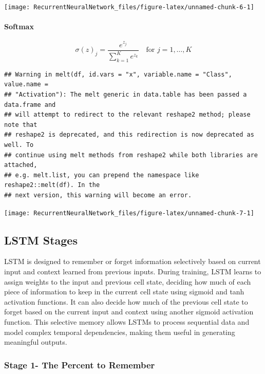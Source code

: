 \documentclass[
]{article}
\begin{document}
\begin{center}\texttt{[image: RecurrentNeuralNetwork\_files/figure-latex/unnamed-chunk-6-1]} \end{center}

\hypertarget{softmax}{%
\paragraph{Softmax}\label{softmax}}

\[ \sigma(z)_j = \frac{e^{z_j}}{\sum_{k=1}^K e^{z_k}} \quad \text{for } j = 1,\dots,K \]

\begin{verbatim}
## Warning in melt(df, id.vars = "x", variable.name = "Class", value.name =
## "Activation"): The melt generic in data.table has been passed a data.frame and
## will attempt to redirect to the relevant reshape2 method; please note that
## reshape2 is deprecated, and this redirection is now deprecated as well. To
## continue using melt methods from reshape2 while both libraries are attached,
## e.g. melt.list, you can prepend the namespace like reshape2::melt(df). In the
## next version, this warning will become an error.
\end{verbatim}

\begin{center}\texttt{[image: RecurrentNeuralNetwork\_files/figure-latex/unnamed-chunk-7-1]} \end{center}

\hypertarget{lstm-stages}{%
\subsection{LSTM Stages}\label{lstm-stages}}

LSTM is designed to remember or forget information selectively based on
current input and context learned from previous inputs. During training,
LSTM learns to assign weights to the input and previous cell state,
deciding how much of each piece of information to keep in the current
cell state using sigmoid and tanh activation functions. It can also
decide how much of the previous cell state to forget based on the
current input and context using another sigmoid activation function.
This selective memory allows LSTMs to process sequential data and model
complex temporal dependencies, making them useful in generating
meaningful outputs.

\hypertarget{stage-1--the-percent-to-remember}{%
\subsubsection{Stage 1- The Percent to
Remember}\label{stage-1--the-percent-to-remember}}
\end{document}
